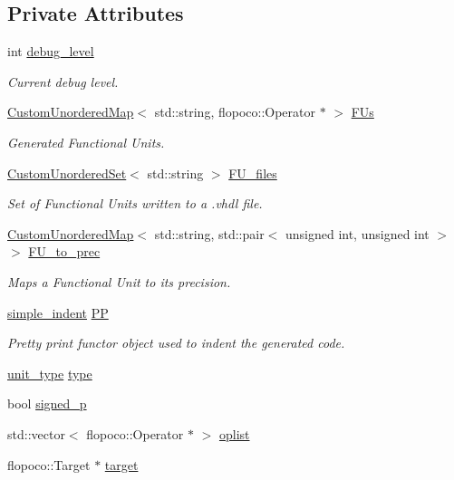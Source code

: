 \subsection*{Private Attributes}
\begin{DoxyCompactItemize}
\item 
int \hyperlink{classflopoco__wrapper_a4adf4414034e81e388ddbdb16e7da779}{debug\+\_\+level}
\begin{DoxyCompactList}\small\item\em Current debug level. \end{DoxyCompactList}\item 
\hyperlink{custom__map_8hpp_ad1ed68f2ff093683ab1a33522b144adc}{Custom\+Unordered\+Map}$<$ std\+::string, flopoco\+::\+Operator $\ast$ $>$ \hyperlink{classflopoco__wrapper_a6b4e28e7702c15a3b88902608b390776}{F\+Us}
\begin{DoxyCompactList}\small\item\em Generated Functional Units. \end{DoxyCompactList}\item 
\hyperlink{classCustomUnorderedSet}{Custom\+Unordered\+Set}$<$ std\+::string $>$ \hyperlink{classflopoco__wrapper_ae066c877bb6b1ddc5a887c97119a4381}{F\+U\+\_\+files}
\begin{DoxyCompactList}\small\item\em Set of Functional Units written to a .vhdl file. \end{DoxyCompactList}\item 
\hyperlink{custom__map_8hpp_ad1ed68f2ff093683ab1a33522b144adc}{Custom\+Unordered\+Map}$<$ std\+::string, std\+::pair$<$ unsigned int, unsigned int $>$ $>$ \hyperlink{classflopoco__wrapper_a60ec3d02b4bbc3dbeaa0115db26357db}{F\+U\+\_\+to\+\_\+prec}
\begin{DoxyCompactList}\small\item\em Maps a Functional Unit to its precision. \end{DoxyCompactList}\item 
\hyperlink{classsimple__indent}{simple\+\_\+indent} \hyperlink{classflopoco__wrapper_ac82c51dbab511806a11535b78b7c106e}{PP}
\begin{DoxyCompactList}\small\item\em Pretty print functor object used to indent the generated code. \end{DoxyCompactList}\item 
\hyperlink{classflopoco__wrapper_a5e24209a3f08ad68bcc6e69ce2924358}{unit\+\_\+type} \hyperlink{classflopoco__wrapper_aa187461f66472ae2d77d3c8425895de7}{type}
\item 
bool \hyperlink{classflopoco__wrapper_ae20312084bdfebdcdff953831960a990}{signed\+\_\+p}
\item 
std\+::vector$<$ flopoco\+::\+Operator $\ast$ $>$ \hyperlink{classflopoco__wrapper_aae89e35cfb20857850eec60323e5f8a3}{oplist}
\item 
flopoco\+::\+Target $\ast$ \hyperlink{classflopoco__wrapper_a6a7d2c36ac45fb5a5c14e33134df2855}{target}
\end{DoxyCompactItemize}


